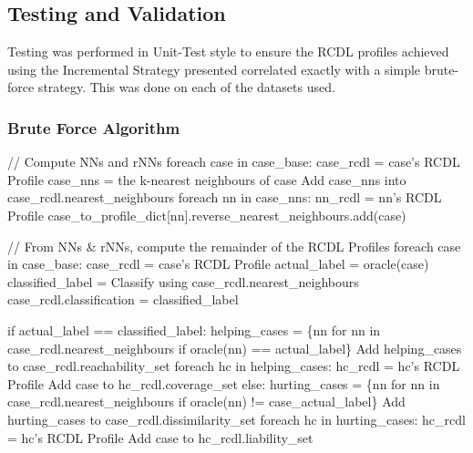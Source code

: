 \documentclass[a4paper,11pt]{report}
\begin{document}
\subsection{Testing and Validation}
Testing was performed in Unit-Test style to ensure the RCDL profiles achieved using the Incremental Strategy presented correlated exactly with a simple brute-force strategy. This was done on each of the datasets used.

\vspace{10pt}

\begin{samepage}
\subsubsection{Brute Force Algorithm}
\begin{code}
// Compute NNs and rNNs
foreach case in case_base:
  case_rcdl = case's RCDL Profile
  case_nns = the k-nearest neighbours of case
  Add case_nns into case_rcdl.nearest_neighbours
  foreach nn in case_nns:
    nn_rcdl = nn's RCDL Profile
    case_to_profile_dict[nn].reverse_nearest_neighbours.add(case)

// From NNs & rNNs, compute the remainder of the RCDL Profiles
foreach case in case_base:
  case_rcdl = case's RCDL Profile
  actual_label = oracle(case)
  classified_label = Classify using case_rcdl.nearest_neighbours
  case_rcdl.classification = classified_label
  
  if actual_label == classified_label:
    helping_cases = \{nn for nn in case_rcdl.nearest_neighbours 
                     if oracle(nn) == actual_label\}
    Add helping_cases to case_rcdl.reachability_set
    foreach hc in helping_cases:
      hc_rcdl = hc's RCDL Profile
      Add case to hc_rcdl.coverage_set
  else:
    hurting_cases = \{nn for nn in case_rcdl.nearest_neighbours 
                     if oracle(nn) != case_actual_label\}
    Add hurting_cases to case_rcdl.dissimilarity_set
    foreach hc in hurting_cases:
      hc_rcdl = hc's RCDL Profile
      Add case to hc_rcdl.liability_set
\end{code}
\end{samepage}

\medspace
\vspace{10pt}

\pagebreak
\end{document}
